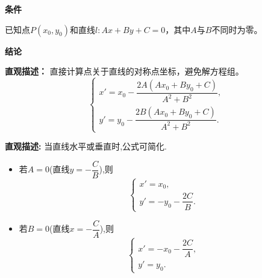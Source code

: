 \begin{statementbox}
	\textbf{\textcolor{CStatement}{条件}}
	\begin{description}[style=nextline, leftmargin=2.8em, labelsep=0.5em, itemsep=0.35em]
		\item[\textbf{\textcolor{CStatement}{条件1（点坐标直线）：}}] 已知点$P(x_0,y_0)$和直线$l:Ax+By+C=0$，其中$A$与$B$不同时为零。
	\end{description}

	\textbf{\textcolor{CStatement}{结论}}
	\begin{description}[style=nextline, leftmargin=2.8em, labelsep=0.5em, itemsep=0.45em]
		\item[\textbf{\textcolor{CStatement}{结论一（对称点公式）：}}]
			\textbf{\textcolor{CStatement}{直观描述：}}
			直接计算点关于直线的对称点坐标，避免解方程组。
			\[
				\begin{cases}
					x' = x_0 - \dfrac{2A(Ax_0+By_0+C)}{A^2+B^2},\\[8pt]
					y' = y_0 - \dfrac{2B(Ax_0+By_0+C)}{A^2+B^2}.
			\end{cases}
			\]

		\item[\textbf{\textcolor{CStatement}{常见变形(水平垂直直线):}}]
			\textbf{\textcolor{CStatement}{直观描述:}}
			当直线水平或垂直时,公式可简化.
			\begin{itemize}[leftmargin=*, itemsep=0.3em]
			\item 若$A=0$(直线$y = -\dfrac{C}{B}$),则
				\[
					\begin{cases}
						x' = x_0,\\[4pt]
						y' = -y_0 - \dfrac{2C}{B}.
				\end{cases}
				\]
			\item 若$B=0$(直线$x = -\dfrac{C}{A}$),则
				\[
					\begin{cases}
						x' = -x_0 - \dfrac{2C}{A},\\[4pt]
						y' = y_0.
				\end{cases}
				\]
		\end{itemize}
	\end{description}

\end{statementbox}
